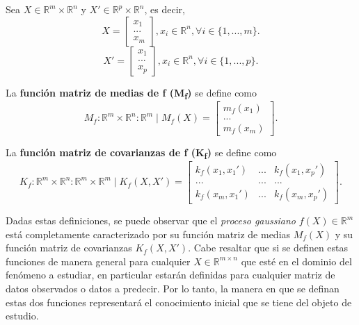 \begin{defin}
Sea $X \in \mathbb{R}^m \times \mathbb{R}^n$ y $X' \in \mathbb{R}^p \times \mathbb{R}^n$, es decir,
\begin{equation*}
    X =     
    \left[
        \begin{array}{c}
        x_1  \\
        ... \\
        x_m
        \end{array}
    \right],
    x_i \in \mathbb{R}^n, \forall i \in \{1,...,m\}.
\end{equation*}
\begin{equation*}
    X' =     
    \left[
        \begin{array}{c}
        x_1  \\
        ... \\
        x_p
        \end{array}
    \right],
    x_i \in \mathbb{R}^n, \forall i \in \{1,...,p\}.
\end{equation*}

La \textbf{función matriz de medias de f (M\textsubscript{f})} se define como
\begin{equation*}
    M_f: \mathbb{R}^m \times \mathbb{R}^n: \mathbb{R}^m
    \mid
    M_f(X) =     
    \left[
        \begin{array}{c}
        m_f(x_1)  \\
        ... \\
        m_f(x_m)
        \end{array}
    \right].
\end{equation*}

La \textbf{función matriz de covarianzas de f (K\textsubscript{f})} se define como
\begin{equation*}
    K_f: \mathbb{R}^m \times \mathbb{R}^n: \mathbb{R}^m \times \mathbb{R}^m
    \mid
    K_f(X,X') =     
    \left[
        \begin{array}{ccc}
        k_f(x_1,x_1') & ... & k_f(x_1,x_p')  \\
        ... & ... & ... \\
        k_f(x_m,x_1') & ... & k_f(x_m,x_p')
        \end{array}
    \right].
\end{equation*}
\end{defin}

Dadas estas definiciones, se puede observar que el \textit{proceso gaussiano} $f(X) \in \mathbb{R}^m$ está completamente caracterizado por su función matriz de medias $M_f(X)$ y su función matriz de covarianzas $K_f(X,X')$. Cabe resaltar que si se definen estas funciones de manera general para cualquier $X \in \mathbb{R}^{m \times n}$ que est\'e en el dominio del fen\'omeno a estudiar, en particular estar\'an definidas para cualquier matriz de datos observados o datos a predecir. Por lo tanto, la manera en que se definan estas dos funciones representar\'a el conocimiento inicial que se tiene del objeto de estudio. 

